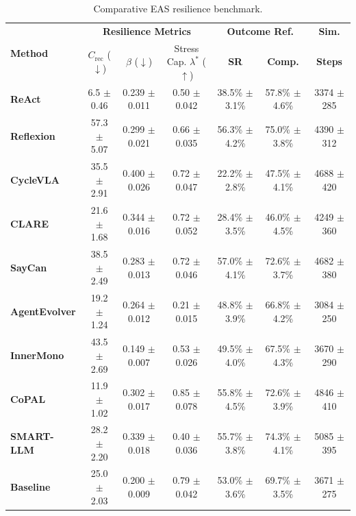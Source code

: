 \begin{table}[t]
    \centering
    \footnotesize
    \caption{Comparative EAS resilience benchmark.} 
    \label{tab:main_benchmark}
    \renewcommand{\arraystretch}{1.1} 
    \setlength{\tabcolsep}{5pt}
    \begin{tabular}{l | c c c | c c | c }
    \toprule
    \multirow{2}{*}{\textbf{Method}} 
    & \multicolumn{3}{c|}{\textbf{Resilience Metrics}} 
    & \multicolumn{2}{c|}{\textbf{Outcome Ref.}}
    & \textbf{Sim.} \\
    & $C_{\mathrm{rec}}$ ($\downarrow$) & $\beta$ ($\downarrow$) & Stress Cap. $\lambda^*$ ($\uparrow$) 
    & \textbf{SR} & \textbf{Comp.} 
    & \textbf{Steps} \\
    \midrule
    \textbf{ReAct}       & 6.5 $\pm$ 0.46  & 0.239 $\pm$ 0.011 & 0.50 $\pm$ 0.042 & 38.5\% $\pm$ 3.1\% & 57.8\% $\pm$ 4.6\% & 3374 $\pm$ 285 \\
    \textbf{Reflexion}   & 57.3 $\pm$ 5.07 & 0.299 $\pm$ 0.021 & 0.66 $\pm$ 0.035 & 56.3\% $\pm$ 4.2\% & 75.0\% $\pm$ 3.8\% & 4390 $\pm$ 312 \\
    \textbf{CycleVLA}    & 35.5 $\pm$ 2.91 & 0.400 $\pm$ 0.026 & 0.72 $\pm$ 0.047 & 22.2\% $\pm$ 2.8\% & 47.5\% $\pm$ 4.1\% & 4688 $\pm$ 420 \\
    \textbf{CLARE}       & 21.6 $\pm$ 1.68 & 0.344 $\pm$ 0.016 & 0.72 $\pm$ 0.052 & 28.4\% $\pm$ 3.5\% & 46.0\% $\pm$ 4.5\% & 4249 $\pm$ 360 \\
    \textbf{SayCan}      & 38.5 $\pm$ 2.49 & 0.283 $\pm$ 0.013 & 0.72 $\pm$ 0.046 & 57.0\% $\pm$ 4.1\% & 72.6\% $\pm$ 3.7\% & 4682 $\pm$ 380 \\
    \textbf{AgentEvolver}& 19.2 $\pm$ 1.24 & 0.264 $\pm$ 0.012 & 0.21 $\pm$ 0.015 & 48.8\% $\pm$ 3.9\% & 66.8\% $\pm$ 4.2\% & 3084 $\pm$ 250 \\
    \textbf{InnerMono}   & 43.5 $\pm$ 2.69 & 0.149 $\pm$ 0.007 & 0.53 $\pm$ 0.026 & 49.5\% $\pm$ 4.0\% & 67.5\% $\pm$ 4.3\% & 3670 $\pm$ 290 \\
    \textbf{CoPAL}       & 11.9 $\pm$ 1.02 & 0.302 $\pm$ 0.017 & 0.85 $\pm$ 0.078 & 55.8\% $\pm$ 4.5\% & 72.6\% $\pm$ 3.9\% & 4846 $\pm$ 410 \\
    \textbf{SMART-LLM}   & 28.2 $\pm$ 2.20 & 0.339 $\pm$ 0.018 & 0.40 $\pm$ 0.036 & 55.7\% $\pm$ 3.8\% & 74.3\% $\pm$ 4.1\% & 5085 $\pm$ 395 \\
    \textbf{Baseline}    & 25.0 $\pm$ 2.03 & 0.200 $\pm$ 0.009 & 0.79 $\pm$ 0.042 & 53.0\% $\pm$ 3.6\% & 69.7\% $\pm$ 3.5\% & 3671 $\pm$ 275 \\
    \bottomrule
    \end{tabular}
    \vspace{-0.2cm}
\end{table}